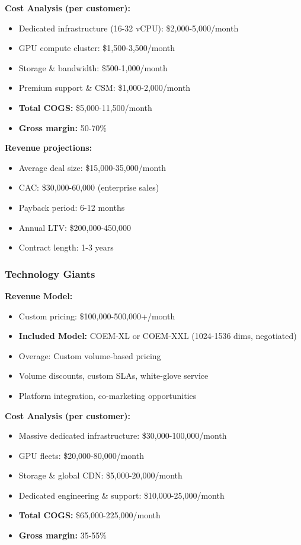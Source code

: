 \textbf{Cost Analysis (per customer):}
\begin{itemize}[noitemsep]
    \item Dedicated infrastructure (16-32 vCPU): \$2,000-5,000/month
    \item GPU compute cluster: \$1,500-3,500/month
    \item Storage \& bandwidth: \$500-1,000/month
    \item Premium support \& CSM: \$1,000-2,000/month
    \item \textbf{Total COGS:} \$5,000-11,500/month
    \item \textbf{Gross margin:} 50-70\%
\end{itemize}

\textbf{Revenue projections:}
\begin{itemize}[noitemsep]
    \item Average deal size: \$15,000-35,000/month
    \item CAC: \$30,000-60,000 (enterprise sales)
    \item Payback period: 6-12 months
    \item Annual LTV: \$200,000-450,000
    \item Contract length: 1-3 years
\end{itemize}

\subsubsection{Technology Giants}

\textbf{Revenue Model:}
\begin{itemize}[noitemsep]
    \item Custom pricing: \$100,000-500,000+/month
    \item \textbf{Included Model:} COEM-XL or COEM-XXL (1024-1536 dims, negotiated)
    \item Overage: Custom volume-based pricing
    \item Volume discounts, custom SLAs, white-glove service
    \item Platform integration, co-marketing opportunities
\end{itemize}

\textbf{Cost Analysis (per customer):}
\begin{itemize}[noitemsep]
    \item Massive dedicated infrastructure: \$30,000-100,000/month
    \item GPU fleets: \$20,000-80,000/month
    \item Storage \& global CDN: \$5,000-20,000/month
    \item Dedicated engineering \& support: \$10,000-25,000/month
    \item \textbf{Total COGS:} \$65,000-225,000/month
    \item \textbf{Gross margin:} 35-55\%
\end{itemize}

